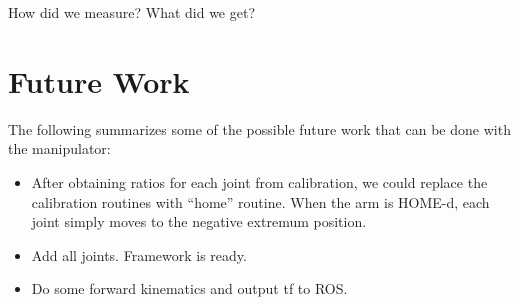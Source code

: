 \documentclass[10pt,a4paper]{article}
\begin{document}
How did we measure?
What did we get?

\section{Future Work}

The following summarizes some of the possible future work that can be
done with the manipulator: 

\begin{itemize}
\item After obtaining ratios for each joint from calibration, we could
  replace the calibration routines with ``home'' routine. When the arm
  is HOME-d, each joint simply moves to the negative extremum
  position. 
\item Add all joints. Framework is ready.
\item Do some forward kinematics and output tf to ROS.
\end{itemize}



\end{document}
